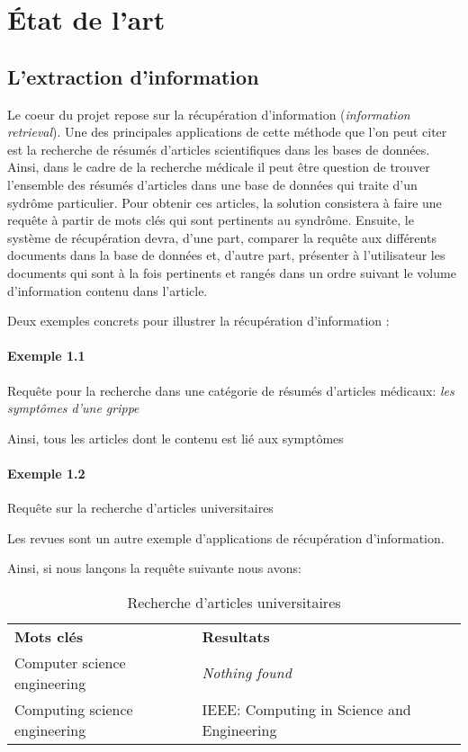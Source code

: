 \section{État de l'art}

\subsection{L'extraction d'information}

Le coeur du projet repose sur la récupération d'information
({\it information retrieval}).
Une des principales applications de cette méthode
que l'on peut citer est la \linebreak
recherche de résumés d'articles scientifiques dans
les bases de données.
Ainsi, dans le cadre de la recherche médicale il peut être
question de trouver l'ensemble des résumés d'articles dans une
base de données qui traite d'un sydrôme particulier.
Pour obtenir ces articles, la solution consistera à faire une requête
à partir de mots clés qui sont pertinents au syndrôme.
Ensuite, le système de récupération devra, d'une part,
comparer la requête aux différents documents dans la base de données
et, d'autre part, présenter à l'utilisateur les documents qui sont
à la fois pertinents et rangés dans un ordre suivant
le volume d'information contenu dans l'article.

Deux exemples concrets pour illustrer la récupération d'information :

\paragraph{Exemple 1.1}
Requête pour la recherche dans une catégorie de résumés
d'articles médicaux: {\it les symptômes d'une grippe}

Ainsi, tous les articles dont le contenu est lié aux symptômes

\paragraph{Exemple 1.2}
Requête sur la recherche d'articles universitaires

Les revues sont un autre exemple d'applications
de récupération d'information.

Ainsi, si nous lançons la requête suivante nous avons:

\begin{table}[!htb]
\begin{center}
\begin{tabular}{l p{6cm}}
\bf Mots clés & \bf Resultats \\
Computer science engineering  & \it Nothing found \\
Computing science engineering
& IEEE: Computing in Science and Engineering
\end{tabular}
\caption{Recherche d'articles universitaires}
\end{center}
\end{table}

